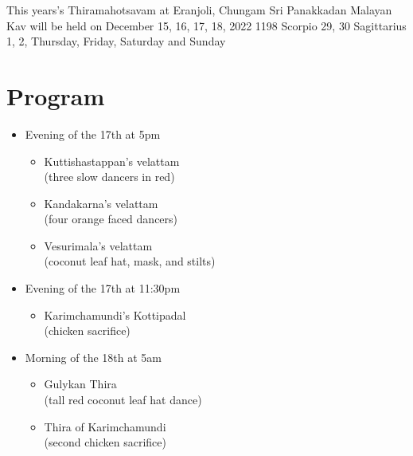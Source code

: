 \documentclass[a4paper, 11pt]{article} %
\begin{document}
This years's Thiramahotsavam at Eranjoli, Chungam Sri Panakkadan Malayan Kav will be held on December 15, 16, 17, 18, 2022 1198 Scorpio 29, 30 Sagittarius 1, 2, Thursday, Friday, Saturday and Sunday


\section{Program}%
  \label{sec:Program}
  
\begin{itemize}
  \item Evening of the 17th at 5pm
  \begin{itemize}
    \item Kuttishastappan's velattam\\
      (three slow dancers in red)
    \item Kandakarna's velattam\\
      (four orange faced dancers)
    \item Vesurimala's velattam\\
      (coconut leaf hat, mask, and stilts)
  \end{itemize}
  \item Evening of the 17th at 11:30pm
  \begin{itemize}
    \item Karimchamundi's Kottipadal\\
      (chicken sacrifice)
  \end{itemize}
  \item Morning of the 18th at 5am
  \begin{itemize}
    \item Gulykan Thira\\
      (tall red coconut leaf hat dance)
    \item Thira of Karimchamundi\\
      (second chicken sacrifice)
  \end{itemize}
\end{itemize}















\vfill

\end{document}
